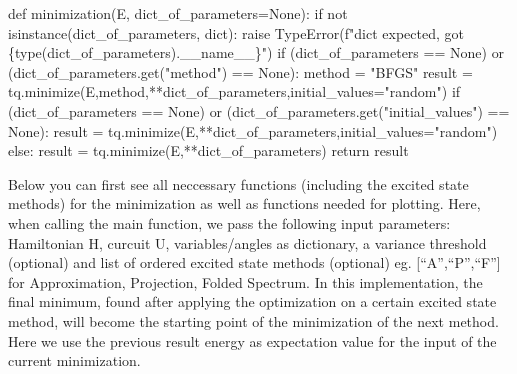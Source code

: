 \documentclass[
  letterpaper,
  DIV=11,
  numbers=noendperiod]{scrartcl}
\newenvironment{Shaded}{\begin{snugshade}}{\end{snugshade}}
\newcommand{\BuiltInTok}[1]{\textcolor[rgb]{0.00,0.23,0.31}{#1}}
\newcommand{\ControlFlowTok}[1]{\textcolor[rgb]{0.00,0.23,0.31}{#1}}
\newcommand{\KeywordTok}[1]{\textcolor[rgb]{0.00,0.23,0.31}{#1}}
\newcommand{\NormalTok}[1]{\textcolor[rgb]{0.00,0.23,0.31}{#1}}
\newcommand{\OperatorTok}[1]{\textcolor[rgb]{0.37,0.37,0.37}{#1}}
\newcommand{\PreprocessorTok}[1]{\textcolor[rgb]{0.68,0.00,0.00}{#1}}
\newcommand{\SpecialCharTok}[1]{\textcolor[rgb]{0.37,0.37,0.37}{#1}}
\newcommand{\SpecialStringTok}[1]{\textcolor[rgb]{0.13,0.47,0.30}{#1}}
\newcommand{\StringTok}[1]{\textcolor[rgb]{0.13,0.47,0.30}{#1}}
\newcommand{\VariableTok}[1]{\textcolor[rgb]{0.07,0.07,0.07}{#1}}
\begin{document}
\begin{Shaded}
\begin{Highlighting}[]
\KeywordTok{def}\NormalTok{ minimization(E, dict\_of\_parameters}\OperatorTok{=}\VariableTok{None}\NormalTok{):}
    \ControlFlowTok{if} \KeywordTok{not} \BuiltInTok{isinstance}\NormalTok{(dict\_of\_parameters, }\BuiltInTok{dict}\NormalTok{):}
        \ControlFlowTok{raise} \PreprocessorTok{TypeError}\NormalTok{(}\SpecialStringTok{f"dict expected, got \textquotesingle{}}\SpecialCharTok{\{}\BuiltInTok{type}\NormalTok{(dict\_of\_parameters)}\SpecialCharTok{.}\VariableTok{\_\_name\_\_}\SpecialCharTok{\}}\SpecialStringTok{\textquotesingle{}"}\NormalTok{)}
    \ControlFlowTok{if}\NormalTok{ (dict\_of\_parameters }\OperatorTok{==} \VariableTok{None}\NormalTok{) }\KeywordTok{or}\NormalTok{ (dict\_of\_parameters.get(}\StringTok{"method"}\NormalTok{) }\OperatorTok{==} \VariableTok{None}\NormalTok{):}
\NormalTok{        method }\OperatorTok{=} \StringTok{"BFGS"}
\NormalTok{        result }\OperatorTok{=}\NormalTok{ tq.minimize(E,method,}\OperatorTok{**}\NormalTok{dict\_of\_parameters,initial\_values}\OperatorTok{=}\StringTok{"random"}\NormalTok{)}
    \ControlFlowTok{if}\NormalTok{ (dict\_of\_parameters }\OperatorTok{==} \VariableTok{None}\NormalTok{) }\KeywordTok{or}\NormalTok{ (dict\_of\_parameters.get(}\StringTok{"initial\_values"}\NormalTok{) }\OperatorTok{==} \VariableTok{None}\NormalTok{):}
\NormalTok{        result }\OperatorTok{=}\NormalTok{ tq.minimize(E,}\OperatorTok{**}\NormalTok{dict\_of\_parameters,initial\_values}\OperatorTok{=}\StringTok{"random"}\NormalTok{)}
    \ControlFlowTok{else}\NormalTok{:}
\NormalTok{        result }\OperatorTok{=}\NormalTok{ tq.minimize(E,}\OperatorTok{**}\NormalTok{dict\_of\_parameters)}
    \ControlFlowTok{return}\NormalTok{ result}
\end{Highlighting}
\end{Shaded}

Below you can first see all neccessary functions (including the excited
state methods) for the minimization as well as functions needed for
plotting. Here, when calling the main function, we pass the following
input parameters: Hamiltonian H, curcuit U, variables/angles as
dictionary, a variance threshold (optional) and list of ordered excited
state methods (optional) eg. {[}``A'',``P'',``F''{]} for Approximation,
Projection, Folded Spectrum. In this implementation, the final minimum,
found after applying the optimization on a certain excited state method,
will become the starting point of the minimization of the next method.
Here we use the previous result energy as expectation value for the
input of the current minimization.
\end{document}

